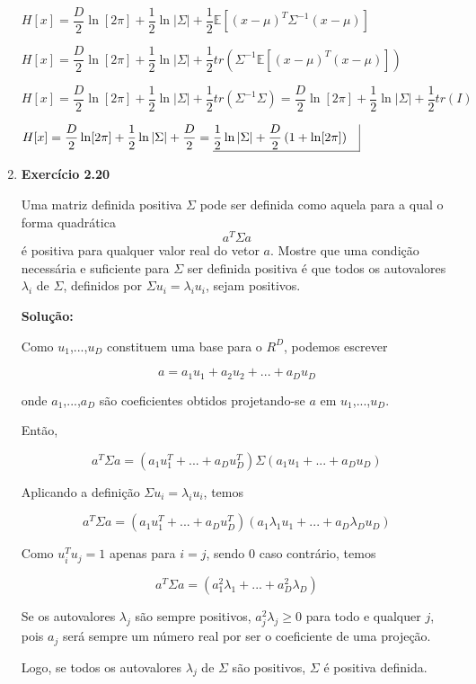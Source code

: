 \begin{enumerate}
$H[x] = \dfrac{D}{2}\ln[2\pi] + \dfrac{1}{2}\ln|\Sigma| + \dfrac{1}{2} \mathbb{E}\left[ (x - \mu)^T \Sigma^{-1} (x - \mu) \right]$

$H[x] = \dfrac{D}{2}\ln[2\pi] + \dfrac{1}{2}\ln|\Sigma| + \dfrac{1}{2} tr\left( \Sigma^{-1} \mathbb{E}\left[ (x - \mu)^T (x - \mu) \right] \right)$

$H[x] = \dfrac{D}{2}\ln[2\pi] + \dfrac{1}{2}\ln|\Sigma| + \dfrac{1}{2} tr\left( \Sigma^{-1} \Sigma \right) = \dfrac{D}{2}\ln[2\pi] + \dfrac{1}{2}\ln|\Sigma| + \dfrac{1}{2} tr\left( I \right)$

$H[x] = \dfrac{D}{2}\ln[2\pi] + \dfrac{1}{2}\ln|\Sigma| + \dfrac{D}{2} = \underline{ \dfrac{1}{2}\ln|\Sigma| + \dfrac{D}{2} \left(1 +  \ln[2\pi] \right) \quad} \vline $




\item \textbf{Exercício 2.20} \par
Uma matriz definida positiva $\Sigma$ pode ser definida como aquela para a qual o forma quadrática
\begin{equation*}
    a^T \Sigma a
\end{equation*} é positiva para qualquer valor real do vetor $a$. Mostre que uma condição necessária e suficiente para $\Sigma$ ser definida positiva é que todos os autovalores $\lambda_i$ de $\Sigma$, definidos por $\Sigma u_i = \lambda_i u_i$, sejam positivos.

\par
\textbf{Solução:}

Como $u_1$,...,$u_D$ constituem uma base para o $R^D$, podemos escrever

$$a = a_1 u_1 + a_2 u_2 + ... + a_D u_ D $$

onde $a_1$,...,$a_D$ são coeficientes obtidos projetando-se $a$ em  $u_1$,...,$u_D$.

Então,

$$a^T \Sigma  a = (a_1 u_1^T + ... + a_D u_ D^T) \Sigma (a_1 u_1 + ... + a_D u_ D)$$

Aplicando a definição $\Sigma u_i = \lambda_i u_i$, temos

$$a^T \Sigma  a = (a_1 u_1^T + ... + a_D u_ D^T) (a_1 \lambda_1 u_1 + ... + a_D \lambda_D u_ D)$$

Como $u_i^T u_j = 1$ apenas para $i=j$, sendo $0$ caso contrário, temos

$$a^T \Sigma  a =  (a_1^2 \lambda_1 + ... + a_D^2 \lambda_D )$$

Se os autovalores $\lambda_j$ são sempre positivos, $a_j^2 \lambda_j \geq 0 $ para todo e qualquer $j$, pois $a_j$ será sempre um número real por ser o coeficiente de uma projeção.

Logo, se todos os autovalores $\lambda_j$ de $\Sigma$ são positivos, $\Sigma$ é positiva definida.


\end{enumerate}